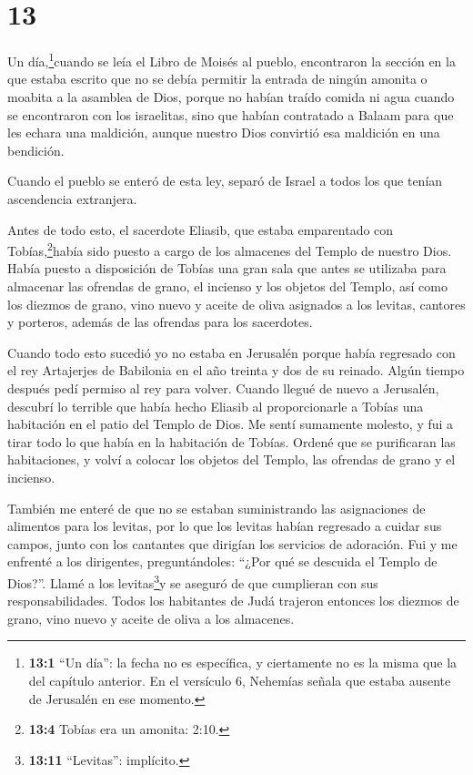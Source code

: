 \hypertarget{section-12}{%
\section{13}\label{section-12}}

 Un día,\footnote{\textbf{13:1} ``Un día'': la fecha no es
  específica, y ciertamente no es la misma que la del capítulo anterior.
  En el versículo 6, Nehemías señala que estaba ausente de Jerusalén en
  ese momento.}cuando se leía el Libro de Moisés al pueblo, encontraron
la sección en la que estaba escrito que no se debía permitir la entrada
de ningún amonita o moabita a la asamblea de Dios,  porque
no habían traído comida ni agua cuando se encontraron con los
israelitas, sino que habían contratado a Balaam para que les echara una
maldición, aunque nuestro Dios convirtió esa maldición en una bendición.

 Cuando el pueblo se enteró de esta ley, separó de Israel a
todos los que tenían ascendencia extranjera.

 Antes de todo esto, el sacerdote Eliasib, que estaba
emparentado con Tobías,\footnote{\textbf{13:4} Tobías era un amonita:
  2:10.}había sido puesto a cargo de los almacenes del Templo de nuestro
Dios.  Había puesto a disposición de Tobías una gran sala
que antes se utilizaba para almacenar las ofrendas de grano, el incienso
y los objetos del Templo, así como los diezmos de grano, vino nuevo y
aceite de oliva asignados a los levitas, cantores y porteros, además de
las ofrendas para los sacerdotes.

 Cuando todo esto sucedió yo no estaba en Jerusalén porque
había regresado con el rey Artajerjes de Babilonia en el año treinta y
dos de su reinado. Algún tiempo después pedí permiso al rey para volver.
 Cuando llegué de nuevo a Jerusalén, descubrí lo terrible
que había hecho Eliasib al proporcionarle a Tobías una habitación en el
patio del Templo de Dios.  Me sentí sumamente molesto, y fui
a tirar todo lo que había en la habitación de Tobías. 
Ordené que se purificaran las habitaciones, y volví a colocar los
objetos del Templo, las ofrendas de grano y el incienso.

 También me enteré de que no se estaban suministrando las
asignaciones de alimentos para los levitas, por lo que los levitas
habían regresado a cuidar sus campos, junto con los cantantes que
dirigían los servicios de adoración.  Fui y me enfrenté a
los dirigentes, preguntándoles: ``¿Por qué se descuida el Templo de
Dios?''. Llamé a los levitas\footnote{\textbf{13:11} ``Levitas'':
  implícito.}y se aseguró de que cumplieran con sus responsabilidades.
 Todos los habitantes de Judá trajeron entonces los diezmos
de grano, vino nuevo y aceite de oliva a los almacenes.

